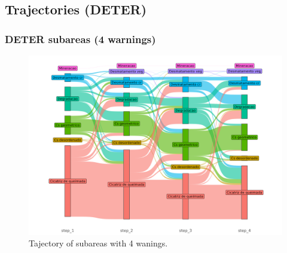 \documentclass[aspectratio=169]{beamer}
\begin{document}
\subsection{Trajectories (DETER)} 





\begin{frame}
    \frametitle{DETER subareas (4 warnings)}
    \begin{figure}[h] 
        \includegraphics[width=0.65\linewidth]
        {./figures/plot_deter_subarea_trajectory_4.png}
        \caption{Tajectory of subareas with 4 wanings.}
        \label{fig:deter_subarea_trajectory_4}
    \end{figure}
\end{frame}
\end{document}

